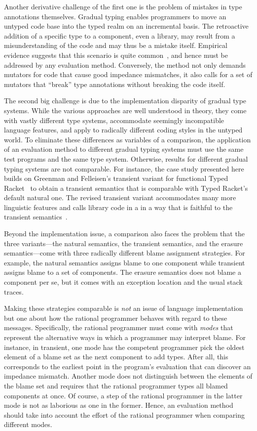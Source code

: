 Another derivative challenge of the first one is the problem of mistakes in type
annotations themselves.  Gradual typing enables programmers to move an untyped
code base into the typed realm on an incremental basis. The retroactive addition
of a specific type to a component, even a library, may result from a
misunderstanding of the code and may thus be a mistake itself. Empirical
evidence suggests that this scenario is quite common~\cite{sta-nt-base-types,
incorrect-ts, wmwz-ecoop-2017}, and hence must be addressed by any evaluation
method. Conversely, the method not only demands mutators for code that cause
good impedance mismatches, it also calls for a set of mutators that ``break''
type annotations without breaking the code itself. 

The second big challenge is due to the implementation disparity of gradual
type systems. While the various approaches are well understood in theory,
they come with vastly different type systems, accommodate seemingly
incompatible language features, and apply to radically different coding
styles in the untyped world.  To eliminate these differences as variables
of a comparison, the application of an evaluation method to different
gradual typing systems must use the same test programs and the same type
system. Otherwise, results for different gradual typing systems are not
comparable.  For instance, the case study presented here builds on
Greenman and Felleisen's transient variant for functional Typed
Racket~\cite{gf-icfp-2018} to obtain a transient semantics that is
comparable with Typed Racket's default natural one. The revised transient
variant accommodates many more linguistic features and calls library code
in a in a way that is faithful to the transient
semantics~\cite{vss-popl-2017}.

Beyond the implementation issue, a comparison also faces the problem that
the three variants---the natural semantics, the transient semantics, and
the erasure semantics---come with three radically different blame
assignment strategies.  For example, the natural semantics assigns blame
to one component while transient assigns blame to a set of components. The
erasure semantics does not blame a component per se, but it comes with an
exception location and the usual stack traces. 

Making these strategies comparable is {\em not\/} an issue of language
implementation but one about how the rational programmer behaves with regard to
these messages. Specifically, the rational programmer must come with \emph{modes}
that represent the alternative ways in which a programmer may interpret blame. 
For instance, in transient, one mode has the competent programmer
pick the oldest element of a blame set as the next component to add types. After
all, this corresponds to the earliest point in the program's evaluation that can
discover an impedance mismatch.  Another mode does not distinguish between the elements of the
blame set and requires that the rational programmer types all blamed components
at once. Of course, a step of the rational programmer in the latter mode
is not as laborious as one in the former. Hence, an evaluation method should take 
into account the effort of the rational programmer when comparing 
different modes.

